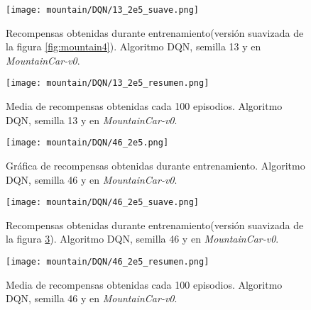 \documentclass[11pt,fleqn]{book} %
\begin{document}
\begin{figure}[H]
	\centering\texttt{[image: mountain/DQN/13\_2e5\_suave.png]}
	\caption{Recompensas obtenidas durante entrenamiento(versión suavizada de la figura \ref{fig:mountain4}). Algoritmo DQN, semilla 13 y en \textit{MountainCar-v0}.}
	\label{fig:mountain5} %
\end{figure}

\begin{figure}[H]
	\centering\texttt{[image: mountain/DQN/13\_2e5\_resumen.png]}
	\caption{Media de recompensas obtenidas cada 100 episodios. Algoritmo DQN, semilla 13 y en \textit{MountainCar-v0}.}
	\label{fig:mountain6} %
\end{figure}

\begin{figure}[H]
	\centering\texttt{[image: mountain/DQN/46\_2e5.png]}
	\caption{Gráfica de recompensas obtenidas durante entrenamiento. Algoritmo DQN, semilla 46 y en \textit{MountainCar-v0}.}
	\label{fig:mountain7} %
\end{figure}

\begin{figure}[H]
	\centering\texttt{[image: mountain/DQN/46\_2e5\_suave.png]}
	\caption{Recompensas obtenidas durante entrenamiento(versión suavizada de la figura \ref{fig:mountain7}). Algoritmo DQN, semilla 46 y en \textit{MountainCar-v0}.}
	\label{fig:mountain8} %
\end{figure}

\begin{figure}[H]
	\centering\texttt{[image: mountain/DQN/46\_2e5\_resumen.png]}
	\caption{Media de recompensas obtenidas cada 100 episodios. Algoritmo DQN, semilla 46 y en \textit{MountainCar-v0}.}
	\label{fig:mountain9} %
\end{figure}
\end{document}
